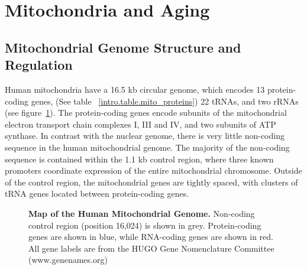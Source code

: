 \section{Mitochondria and Aging}

\subsection{Mitochondrial Genome Structure and Regulation}
Human mitochondria have a 16.5 kb circular genome, which encodes 13 protein-coding genes, (See table ~\ref{intro.table.mito_proteins}) 22 \ac{tRNA}s, and two \ac{rRNA}s (see figure~\ref{intro.fig.mtdna_map}).  The protein-coding genes encode subunits of the mitochondrial electron transport chain complexes I, III and IV, and two subunits of ATP synthase.  In contrast with the nuclear genome, there is very little non-coding sequence in the human mitochondrial genome.  The majority of the non-coding sequence is contained within the 1.1 kb control region, where three known promoters coordinate expression of the entire mitochondrial chromosome.  Outside of the control region, the mitochondrial genes are tightly spaced, with clusters of tRNA genes located between protein-coding genes.

\begin{figure}
\noindent{}
  \caption[Map of the Human Mitochondrial Genome]{
    \small{\textbf{Map of the Human Mitochondrial Genome.} Non-coding control region (position 16,024) is shown in grey.  Protein-coding genes are shown in blue, while RNA-coding genes are shown in red.  All gene labels are from the HUGO Gene Nomenclature Committee (www.genenames.org)}}
  \label{intro.fig.mtdna_map}
\end{figure}

